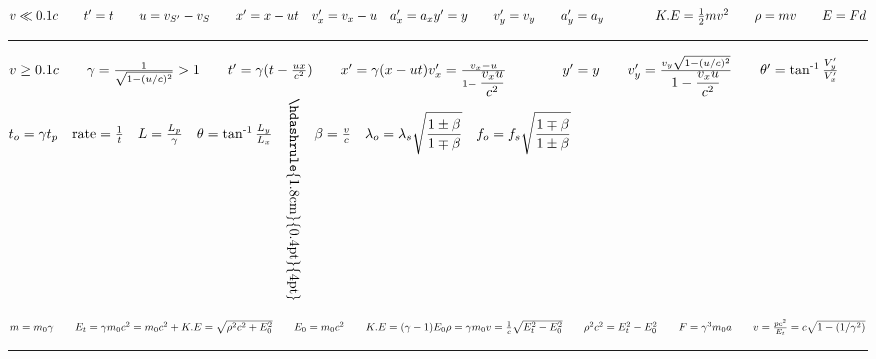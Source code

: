 \documentclass[a4paper,12pt]{article}
\newcommand{\sz}{\text{-}}
\begin{document}

\fontsize{12}{12}\selectfont

\noindent
$
v \ll 0.1c \qquad t^\prime = t \qquad u = v_{S^\prime} - v_S \qquad x^\prime = x - ut \quad v^\prime_x = v_x - u \quad a_x^\prime = a_x \\
y^\prime = y \qquad v^\prime_y = v_y \qquad a_y^\prime = a_y \qquad \qquad K.E = \frac{1}{2} mv^2 \qquad \rho = mv \qquad E = F d
$

{\centering \rule{18cm}{0.4pt} \par}

\noindent
$
v \ge 0.1c \qquad \gamma = \frac{1}{\sqrt{1- (u/c)^2}} > 1 \qquad t^\prime = \gamma (t - \frac{ux}{c^2}) \qquad
x^\prime = \gamma(x - ut)\\ v^\prime_x = \frac{v_x - u}{1 - \displaystyle \frac{v_x u}{c^2} } \qquad \qquad  y^\prime = y \qquad v^\prime_y = \frac{v_y \sqrt{1-(u/c)^2}}{\displaystyle 1- \frac{v_x u}{c^2}} \qquad \theta^\prime = \tan^{\sz 1}{\frac{V_y^\prime}{V_x^\prime}} \\[-3mm]
$

{\centering \hdashrule{18cm}{0.4pt}{4pt} \par}

\noindent
$ t_o = \gamma t_p \quad \text{rate} = \frac{1}{t} \quad L = \frac{L_p}{\gamma} \quad \theta = \tan^{\sz1}{\frac{L_y}{L_x}} \quad \rotatebox{-90}{\hskip-1cm\hdashrule{1.8cm}{0.4pt}{4pt}} \quad
\beta = \frac{v}{c} \quad \lambda_o = \lambda_s \displaystyle \sqrt{\frac{1\pm \beta}{1\mp \beta}} \quad f_o = f_s \displaystyle \sqrt{\frac{1\mp \beta}{1\pm \beta}}\\[-.8cm]
$

{\centering \hdashrule{18cm}{0.4pt}{4pt} \par}

\noindent
$ m = m_0 \gamma \qquad E_t = \gamma m_0c^2 = m_0c^2 + K.E = \sqrt{\rho^2 c^2 + E_0^2} \qquad E_0 = m_0 c^2 \qquad K.E = (\gamma - 1) E_0 \\
\rho = \gamma m_0v = \frac{1}{c} \sqrt{E_t^2 - E_0^2} \qquad \rho^2c^2 = E_t^2 - E_0^2 \qquad F = \gamma^3 m_0 a \qquad v = \frac{p c^2}{E_t} = c \sqrt{1- (1/\gamma^2)} $\\[-1em]

{\centering \rule{18cm}{0.4pt} \par}
\end{document}
